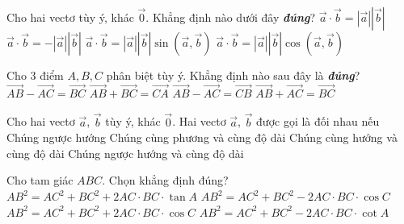 \begin{ex}%
	Cho hai vectơ tùy ý, khác $\overrightarrow{0}$. Khẳng định nào dưới đây \textbf{\textit{đúng}}?
	\choice
	{$\overrightarrow{a}\cdot \overrightarrow{b}=\left| \overrightarrow{a}\right| \left|\overrightarrow{b}\right|$}
	{$\overrightarrow{a}\cdot \overrightarrow{b}=-\left|\overrightarrow{a}\right| \left|\overrightarrow{b}\right|$}
	{$\overrightarrow{a}\cdot \overrightarrow{b}=\left|\overrightarrow{a}\right| \left|\overrightarrow{b}\right|\sin \left(\overrightarrow{a},\overrightarrow{b}\right)$}
	{\True $\overrightarrow{a}\cdot \overrightarrow{b}=\left|\overrightarrow{a}\right| \left|\overrightarrow{b}\right|\cos (\overrightarrow{a},\overrightarrow{b})$}
\end{ex}

\begin{ex}%
	Cho $3$ điểm $A,B,C$ phân biệt tùy ý. Khẳng định nào sau đây là \textbf{\textit{đúng}}?
	\choice
	{$\overrightarrow{AB}-\overrightarrow{AC}=\overrightarrow{BC}$}
	{$\overrightarrow{AB}+\overrightarrow{BC}=\overrightarrow{CA}$}
	{\True $\overrightarrow{AB}-\overrightarrow{AC}=\overrightarrow{CB}$}
	{$\overrightarrow{AB}+\overrightarrow{AC}=\overrightarrow{BC}$}
\end{ex}

\begin{ex}%
	Cho hai vectơ $\overrightarrow{a}$, $\overrightarrow{b}$ tùy ý, khác $\overrightarrow{0}$. Hai vectơ $\overrightarrow{a}$, $\overrightarrow{b}$ được gọi là đối nhau nếu
	\choice
	{Chúng ngược hướng}
	{Chúng cùng phương và cùng độ dài}
	{Chúng cùng hướng và cùng độ dài}
	{\True Chúng ngược hướng và cùng độ dài}
\end{ex}

\begin{ex}%
	Cho tam giác $ABC$. Chọn khẳng định đúng?
	\choice
	{$AB^2=AC^2+BC^2+2AC\cdot BC\cdot \tan A$}
	{\True $AB^2=AC^2+BC^2-2AC\cdot BC\cdot \cos C$}
	{$AB^2=AC^2+BC^2+2AC\cdot BC\cdot \cos C$}
	{$AB^2=AC^2+BC^2-2AC\cdot BC\cdot \cot A$}
\end{ex}

